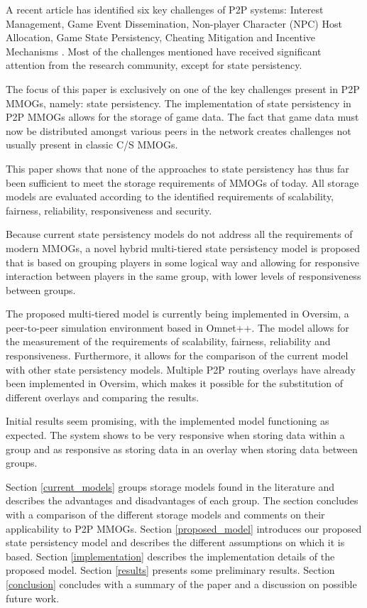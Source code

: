 \documentclass[10pt,a4paper,journal,cspaper,compsoc]{IEEEtran}
\begin{document}
A recent article has identified six key challenges of P2P systems: Interest Management, Game Event Dissemination, Non-player Character (NPC) Host
Allocation, Game State Persistency, Cheating Mitigation and Incentive Mechanisms \cite{Fan_deisgn_issues_p2p}. Most of the challenges mentioned have
received significant attention from the research community, except for state persistency.

The focus of this paper is exclusively on one of the key challenges present in P2P MMOGs, namely: state persistency. The implementation of state
persistency in P2P MMOGs allows for the storage of game data. The fact that game data must now be distributed amongst various peers in the network
creates challenges not usually present in classic C/S MMOGs.

This paper shows that none of the approaches to state persistency has thus far been sufficient to meet the storage requirements of MMOGs of today.
All storage models are evaluated according to the identified requirements of scalability, fairness, reliability, responsiveness and security.

Because current state persistency models do not address all the requirements of modern MMOGs, a novel hybrid multi-tiered state persistency model is
proposed that is based on grouping players in some logical way and allowing for responsive interaction between players in the same group, with lower
levels of responsiveness between groups.

The proposed multi-tiered model is currently being implemented in Oversim, a peer-to-peer simulation environment based in Omnet++. The model allows
for the measurement of the requirements of scalability, fairness, reliability and responsiveness. Furthermore, it allows for the comparison of the
current model with other state persistency models. Multiple P2P routing overlays have already been implemented in Oversim, which makes it possible
for the substitution of different overlays and comparing the results.

Initial results seem promising, with the implemented model functioning as expected. The system shows to be very responsive when storing data within a
group and as responsive as storing data in an overlay when storing data between groups.

Section \ref{current_models} groups storage models found in the literature and describes the advantages and disadvantages of each group. The section
concludes with a comparison of the different storage models and comments on their applicability to P2P MMOGs.
%
Section \ref{proposed_model} introduces our proposed state persistency model and describes the different assumptions on which it is based.
%
Section \ref{implementation} describes the implementation details of the proposed model.
%
Section \ref{results} presents some preliminary results.
%
Section \ref{conclusion} concludes with a summary of the paper and a discussion on possible future work.
\end{document}
